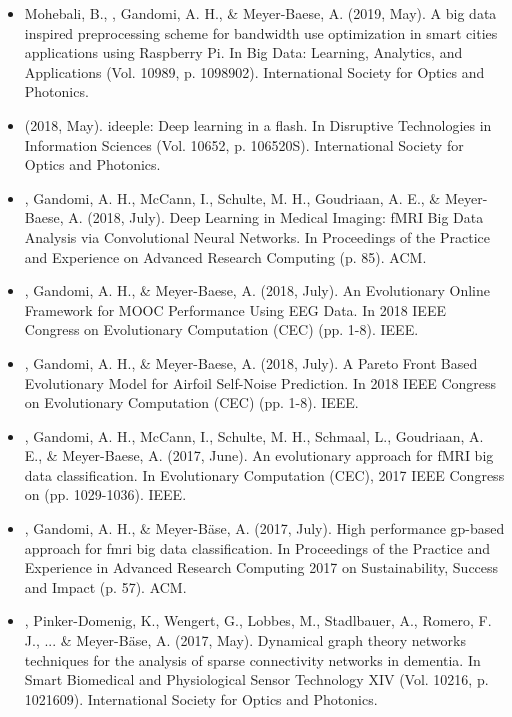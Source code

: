 \documentclass[]{template}
\begin{document}
\begin{itemize}
\item Mohebali, B., , Gandomi, A. H., \& Meyer-Baese, A. (2019, May). A big data inspired preprocessing scheme for bandwidth use optimization in smart cities applications using Raspberry Pi. In Big Data: Learning, Analytics, and Applications (Vol. 10989, p. 1098902). International Society for Optics and Photonics.

\item {} (2018, May). ideeple: Deep learning in a flash. In Disruptive Technologies in Information Sciences (Vol. 10652, p. 106520S). International Society for Optics and Photonics.

\item {}, Gandomi, A. H., McCann, I., Schulte, M. H., Goudriaan, A. E., \& Meyer-Baese, A. (2018, July). Deep Learning in Medical Imaging: fMRI Big Data Analysis via Convolutional Neural Networks. In Proceedings of the Practice and Experience on Advanced Research Computing (p. 85). ACM.


\item {}, Gandomi, A. H., \& Meyer-Baese, A. (2018, July). An Evolutionary Online Framework for MOOC Performance Using EEG Data. In 2018 IEEE Congress on Evolutionary Computation (CEC) (pp. 1-8). IEEE.\\

\item {}, Gandomi, A. H., \& Meyer-Baese, A. (2018, July). A Pareto Front Based Evolutionary Model for Airfoil Self-Noise Prediction. In 2018 IEEE Congress on Evolutionary Computation (CEC) (pp. 1-8). IEEE.\\

\item {}, Gandomi, A. H., McCann, I., Schulte, M. H., Schmaal, L., Goudriaan, A. E., \& Meyer-Baese, A. (2017, June). An evolutionary approach for fMRI big data classification. In Evolutionary Computation (CEC), 2017 IEEE Congress on (pp. 1029-1036). IEEE.\\


\item {}, Gandomi, A. H., \& Meyer-Bäse, A. (2017, July). High performance gp-based approach for fmri big data classification. In Proceedings of the Practice and Experience in Advanced Research Computing 2017 on Sustainability, Success and Impact (p. 57). ACM.

\item {}, Pinker-Domenig, K., Wengert, G., Lobbes, M., Stadlbauer, A., Romero, F. J., ... \& Meyer-Bäse, A. (2017, May). Dynamical graph theory networks techniques for the analysis of sparse connectivity networks in dementia. In Smart Biomedical and Physiological Sensor Technology XIV (Vol. 10216, p. 1021609). International Society for Optics and Photonics.



\end{itemize}
\end{document}
